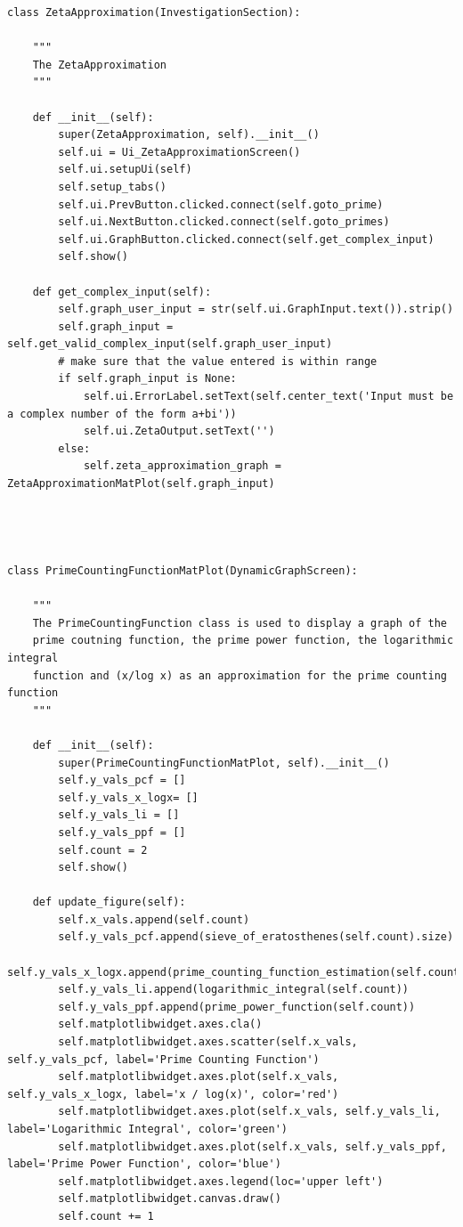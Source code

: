 \documentclass{article}
\begin{document}
\begin{lstlisting}
class ZetaApproximation(InvestigationSection):

    """
    The ZetaApproximation
    """

    def __init__(self):
        super(ZetaApproximation, self).__init__()
        self.ui = Ui_ZetaApproximationScreen()
        self.ui.setupUi(self)
        self.setup_tabs()
        self.ui.PrevButton.clicked.connect(self.goto_prime)
        self.ui.NextButton.clicked.connect(self.goto_primes)
        self.ui.GraphButton.clicked.connect(self.get_complex_input)
        self.show()

    def get_complex_input(self):
        self.graph_user_input = str(self.ui.GraphInput.text()).strip()
        self.graph_input = self.get_valid_complex_input(self.graph_user_input)
        # make sure that the value entered is within range
        if self.graph_input is None:
            self.ui.ErrorLabel.setText(self.center_text('Input must be a complex number of the form a+bi'))
            self.ui.ZetaOutput.setText('')
        else:
            self.zeta_approximation_graph = ZetaApproximationMatPlot(self.graph_input)




class PrimeCountingFunctionMatPlot(DynamicGraphScreen):

    """
    The PrimeCountingFunction class is used to display a graph of the
    prime coutning function, the prime power function, the logarithmic integral
    function and (x/log x) as an approximation for the prime counting function
    """

    def __init__(self):
        super(PrimeCountingFunctionMatPlot, self).__init__()
        self.y_vals_pcf = []
        self.y_vals_x_logx= []
        self.y_vals_li = []
        self.y_vals_ppf = []
        self.count = 2
        self.show()

    def update_figure(self):
        self.x_vals.append(self.count)
        self.y_vals_pcf.append(sieve_of_eratosthenes(self.count).size)
        self.y_vals_x_logx.append(prime_counting_function_estimation(self.count))
        self.y_vals_li.append(logarithmic_integral(self.count))
        self.y_vals_ppf.append(prime_power_function(self.count))
        self.matplotlibwidget.axes.cla()
        self.matplotlibwidget.axes.scatter(self.x_vals, self.y_vals_pcf, label='Prime Counting Function')
        self.matplotlibwidget.axes.plot(self.x_vals, self.y_vals_x_logx, label='x / log(x)', color='red')
        self.matplotlibwidget.axes.plot(self.x_vals, self.y_vals_li, label='Logarithmic Integral', color='green')
        self.matplotlibwidget.axes.plot(self.x_vals, self.y_vals_ppf, label='Prime Power Function', color='blue')
        self.matplotlibwidget.axes.legend(loc='upper left')
        self.matplotlibwidget.canvas.draw()
        self.count += 1



\end{lstlisting}
\end{document}
